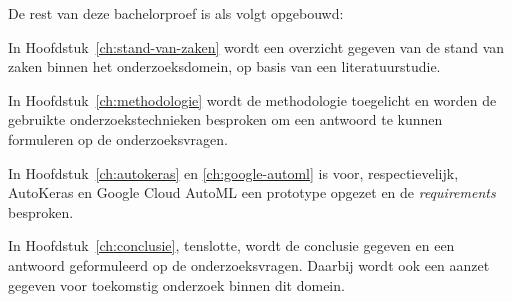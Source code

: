 De rest van deze bachelorproef is als volgt opgebouwd:

In Hoofdstuk~\ref{ch:stand-van-zaken} wordt een overzicht gegeven van de stand van zaken binnen het onderzoeksdomein, op basis van een literatuurstudie.

In Hoofdstuk~\ref{ch:methodologie} wordt de methodologie toegelicht en worden de gebruikte onderzoekstechnieken besproken om een antwoord te kunnen formuleren op de onderzoeksvragen.

In Hoofdstuk~\ref{ch:autokeras} en \ref{ch:google-automl} is voor, respectievelijk, AutoKeras en Google Cloud AutoML een prototype opgezet en de \textit{requirements} besproken.

In Hoofdstuk~\ref{ch:conclusie}, tenslotte, wordt de conclusie gegeven en een antwoord geformuleerd op de onderzoeksvragen. Daarbij wordt ook een aanzet gegeven voor toekomstig onderzoek binnen dit domein.